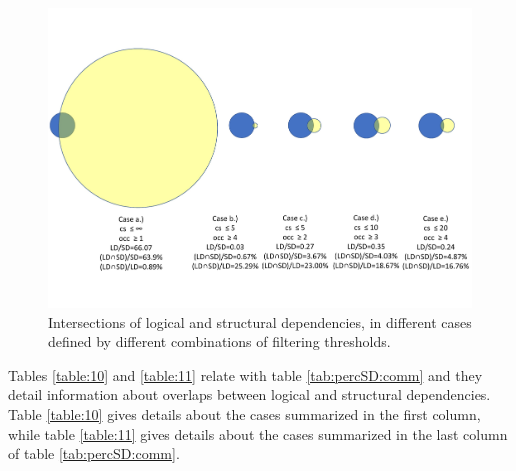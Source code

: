 \documentclass[conference]{IEEEtran}
\begin{document}
\begin{figure}[!t]
\centering
\includegraphics[width=5.7in]{fig.pdf}
\vspace{-1cm}
\caption{Intersections of logical and structural dependencies, in different cases defined by different combinations of filtering thresholds. }
\label{fig_venn}
\end{figure}




Tables \ref{table:10} and \ref{table:11} relate with table \ref{tab:percSD:comm} and they detail information about overlaps between logical and structural dependencies. Table \ref{table:10} gives details about the cases summarized in the first column, while table \ref{table:11} gives details about the cases summarized in the last column of table \ref{tab:percSD:comm}.
  
\end{document}
